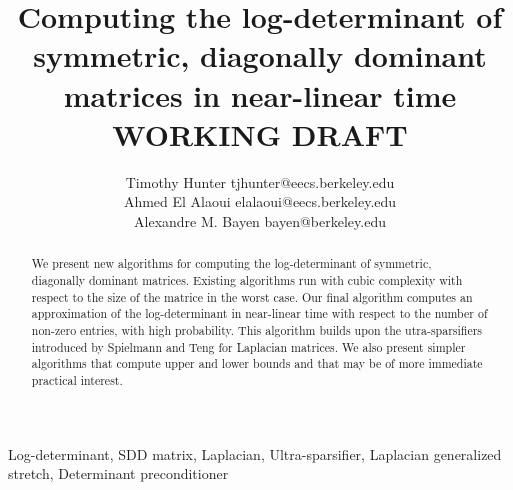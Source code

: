 \documentclass[onefignum,onetabnum]{siamltex1213}
\title{Computing the log-determinant of symmetric, diagonally dominant matrices
in near-linear time\\
WORKING DRAFT}
\author{Timothy Hunter \email tjhunter@eecs.berkeley.edu \\
Ahmed {El Alaoui} \email elalaoui@eecs.berkeley.edu\\
Alexandre M. Bayen \email bayen@berkeley.edu}
\begin{document}
\maketitle

\begin{abstract}
We present new algorithms for computing the log-determinant of symmetric,
diagonally dominant matrices. Existing algorithms run with cubic complexity
with respect to the size of the matrice in the worst case. Our final algorithm 
computes an approximation of the log-determinant in near-linear time with 
respect to the number of non-zero entries, with high probability. This 
algorithm builds upon the utra-sparsifiers introduced by Spielmann and Teng for
Laplacian matrices. We also present simpler algorithms that compute upper and 
lower bounds and that may be of more immediate practical interest.
\end{abstract}

\begin{keywords}
Log-determinant,
SDD matrix,
Laplacian,
Ultra-sparsifier,
Laplacian generalized stretch,
Determinant preconditioner
\end{keywords}

\begin{AMS}\end{AMS}


\pagestyle{myheadings}

\thispagestyle{plain}














% 

% 
\end{document}
